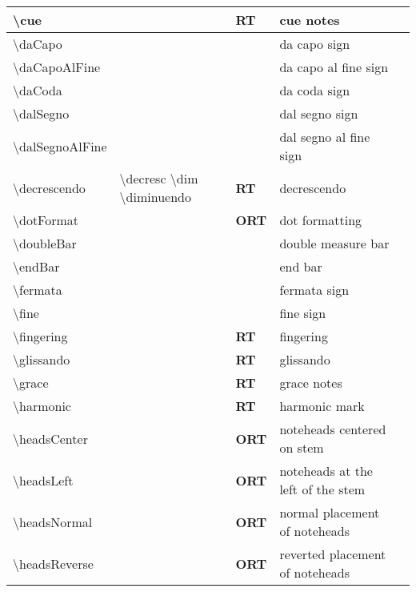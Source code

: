 \documentclass[a4paper, landscape, 11pt]{article}
\begin{document}
\begin{tabularx}{\linewidth}{p{3cm}p{5cm}lll}
    \hline
    \textbackslash{}cue&&\textbf{RT}&cue notes&\\
    \hline
    \textbackslash{}daCapo&&&da capo sign&\\
    \hline
    \textbackslash{}daCapoAlFine&&&da capo al fine sign&\\
    \hline
    \textbackslash{}daCoda&&&da coda sign&\\
    \hline
    \textbackslash{}dalSegno&&&dal segno sign&\\
    \hline
    \textbackslash{}dalSegnoAlFine&&&dal segno al fine sign&\\
    \hline
    \textbackslash{}decrescendo&\textbackslash{}decresc \textbackslash{}dim \textbackslash{}diminuendo&\textbf{RT}&decrescendo&\\
    \hline
    \textbackslash{}dotFormat&&\textbf{ORT}&dot formatting&\\
    \hline
    \textbackslash{}doubleBar&&&double measure bar&\\
    \hline
    \textbackslash{}endBar&&&end bar&\\
    \hline
    \textbackslash{}fermata&&&fermata sign&\\
    \hline
    \textbackslash{}fine&&&fine sign&\\
    \hline
    \textbackslash{}fingering&&\textbf{RT}&fingering&\\
    \hline
    \textbackslash{}glissando&&\textbf{RT}&glissando&\\
    \hline
    \textbackslash{}grace&&\textbf{RT}&grace notes&\\
    \hline
    \textbackslash{}harmonic&&\textbf{RT}&harmonic mark&\\
    \hline
    \textbackslash{}headsCenter&&\textbf{ORT}&noteheads centered on stem&\\
    \hline
    \textbackslash{}headsLeft&&\textbf{ORT}&noteheads at the left of the stem&\\
    \hline
    \textbackslash{}headsNormal&&\textbf{ORT}&normal placement of noteheads&\\
    \hline
    \textbackslash{}headsReverse&&\textbf{ORT}&reverted placement of noteheads&\\
    \hline
\end{tabularx}
%
\end{document}
